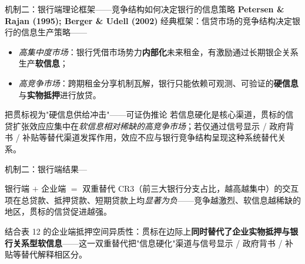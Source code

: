 \begin{frame}{机制二：银行端理论框架——竞争结构如何决定银行的信息策略}
  \textbf{Petersen \& Rajan (1995); Berger \& Udell (2002)} 经典框架：信贷市场的竞争结构决定银行的信息生产策略——

  \vspace{0.4em}
  \begin{itemize}
    \setlength\itemsep{0.5em}
    \item \emph{高集中度市场}：银行凭借市场势力\textbf{内部化}未来租金，有激励通过长期银企关系生产\textbf{软信息}；
    \item \emph{高竞争市场}：跨期租金分享机制瓦解，银行只能依赖可观测、可验证的\textbf{硬信息}与\textbf{实物抵押}进行放贷。
  \end{itemize}

  \vspace{0.4em}
  \begin{methodbox}{把贯标视为"硬信息供给冲击"——可证伪推论}
    若信息硬化是核心渠道，贯标的信贷扩张效应应集中在\emph{软信息相对稀缺的高竞争市场}；若仅通过信号显示 / 政府背书 / 补贴等替代渠道发挥作用，效应不应与银行竞争结构呈现这种系统替代关系。
  \end{methodbox}
\end{frame}

\begin{frame}{机制二：银行端结果—}
  

  \begin{findingbox}{银行端 $+$ 企业端 $=$ 双重替代}
    \footnotesize
    CR3（前三大银行分支占比，越高越集中）的交互项在总贷款、抵押贷款、短期贷款上均\emph{显著为负}——竞争越激烈、软信息越稀缺的地区，贯标的信贷促进越强。

    \medskip
    结合表 12 的企业端抵押空间异质性：贯标在边际上\textbf{同时替代了企业实物抵押与银行关系型软信息}——这一双重替代把"信息硬化"渠道与信号显示 / 政府背书 / 补贴等替代解释相区分。
  \end{findingbox}
\end{frame}

